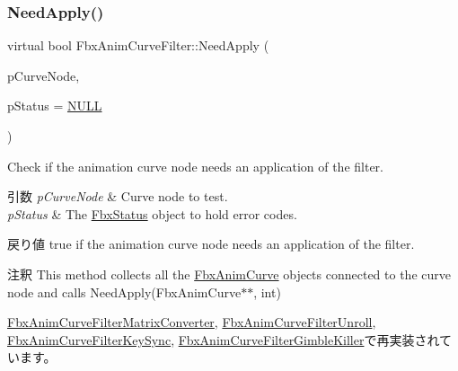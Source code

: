 \mbox{\label{class_fbx_anim_curve_filter_a2a88d855d34bb1f2f22ca8386020b33a}} 
\subsubsection{\texorpdfstring{Need\+Apply()}{NeedApply()}\hspace{0.1cm}{\footnotesize\ttfamily [3/5]}}
{\footnotesize\ttfamily virtual bool Fbx\+Anim\+Curve\+Filter\+::\+Need\+Apply (\begin{DoxyParamCaption}\item[{\hyperlink{class_fbx_anim_curve_node}{Fbx\+Anim\+Curve\+Node} \&}]{p\+Curve\+Node,  }\item[{\hyperlink{class_fbx_status}{Fbx\+Status} $\ast$}]{p\+Status = {\ttfamily \hyperlink{fbxarch_8h_a070d2ce7b6bb7e5c05602aa8c308d0c4}{N\+U\+LL}} }\end{DoxyParamCaption})\hspace{0.3cm}{\ttfamily [virtual]}}

Check if the animation curve node needs an application of the filter. 
\begin{DoxyParams}{引数}
{\em p\+Curve\+Node} & Curve node to test. \\
\hline
{\em p\+Status} & The \hyperlink{class_fbx_status}{Fbx\+Status} object to hold error codes. \\
\hline
\end{DoxyParams}
\begin{DoxyReturn}{戻り値}
{\ttfamily true} if the animation curve node needs an application of the filter. 
\end{DoxyReturn}
\begin{DoxyRemark}{注釈}
This method collects all the \hyperlink{class_fbx_anim_curve}{Fbx\+Anim\+Curve} objects connected to the curve node and calls Need\+Apply(\+Fbx\+Anim\+Curve$\ast$$\ast$, int) 
\end{DoxyRemark}


\hyperlink{class_fbx_anim_curve_filter_matrix_converter_a00f04a303254479eef1aa3bfbe0643d8}{Fbx\+Anim\+Curve\+Filter\+Matrix\+Converter}, \hyperlink{class_fbx_anim_curve_filter_unroll_ad3df0b89af14237342197a8832e3d94f}{Fbx\+Anim\+Curve\+Filter\+Unroll}, \hyperlink{class_fbx_anim_curve_filter_key_sync_a72cb983cb554a070688eb0990d4b7576}{Fbx\+Anim\+Curve\+Filter\+Key\+Sync}, \hyperlink{class_fbx_anim_curve_filter_gimble_killer_a72a761452f1a110353be0b6cae920e24}{Fbx\+Anim\+Curve\+Filter\+Gimble\+Killer}で再実装されています。

